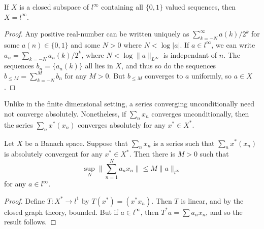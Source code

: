 \begin{lemma}
    If $X$ is a closed subspace of $l^\infty$ containing all $\{ 0, 1 \}$ valued sequences, then $X = l^\infty$.
\end{lemma}
\begin{proof}
    Any positive real-number can be written uniquely as $\sum_{k = -N}^\infty a(k) / 2^k$ for some $a(n) \in \{ 0, 1 \}$ and some $N > 0$ where $N < \log |a|$. If $a \in l^\infty$, we can write $a_n = \sum_{k = -N} a_n(k) / 2^k$, where $N < \log \| a \|_{L^\infty}$ is independant of $n$. The sequences $b_n = \{ a_n(k) \}$ all lies in $X$, and thus so do the sequences $b_{\leq M} = \sum_{k = -N}^M b_n$ for any $M > 0$. But $b_{\leq M}$ converges to $a$ uniformly, so $a \in X$.
\end{proof}

Unlike in the finite dimensional setting, a series converging unconditionally need not converge absolutely. Nonetheless, if $\sum_n x_n$ converges unconditionally, then the series $\sum_n x^*(x_n)$ converges absolutely for any $x^* \in X^*$.

\begin{lemma}
    Let $X$ be a Banach space. Suppose that $\sum_n x_n$ is a series such that $\sum_n x^*(x_n)$ is absolutely convergent for any $x^* \in X^*$. Then there is $M > 0$ such that
    \[ \sup_N \| \sum_{n = 1}^N a_n x_n \| \leq M \| a \|_{l^\infty} \]
    for any $a \in l^\infty$.
\end{lemma}
\begin{proof}
    Define $T: X^* \to l^1$ by $T(x^*) = (x^* x_n)$. Then $T$ is linear, and by the closed graph theory, bounded. But if $a \in l^\infty$, then $T^*a = \sum a_n x_n$, and so the result follows.
\end{proof}

